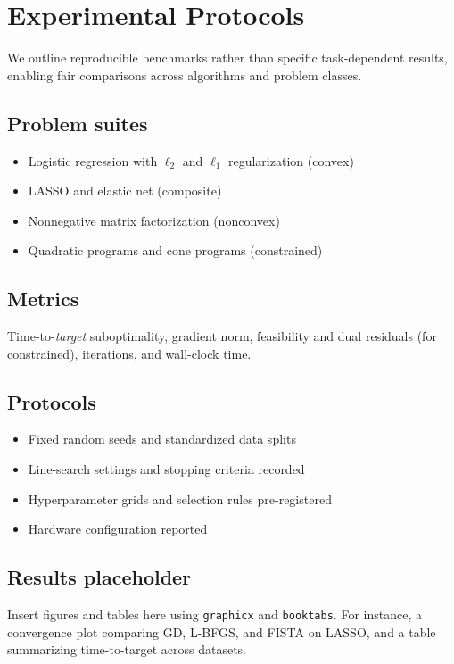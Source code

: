 \section{Experimental Protocols}
\label{sec:experiments}
We outline reproducible benchmarks rather than specific task-dependent results, enabling fair comparisons across algorithms and problem classes.

\subsection{Problem suites}
\begin{itemize}
  \item Logistic regression with $\ell_2$ and $\ell_1$ regularization (convex)
  \item LASSO and elastic net (composite)
  \item Nonnegative matrix factorization (nonconvex)
  \item Quadratic programs and cone programs (constrained)
\end{itemize}

\subsection{Metrics}
Time-to-\emph{target} suboptimality, gradient norm, feasibility and dual residuals (for constrained), iterations, and wall-clock time.

\subsection{Protocols}
\begin{itemize}
  \item Fixed random seeds and standardized data splits
  \item Line-search settings and stopping criteria recorded
  \item Hyperparameter grids and selection rules pre-registered
  \item Hardware configuration reported
\end{itemize}

\subsection{Results placeholder}
Insert figures and tables here using \texttt{graphicx} and \texttt{booktabs}. For instance, a convergence plot comparing GD, L-BFGS, and FISTA on LASSO, and a table summarizing time-to-target across datasets.